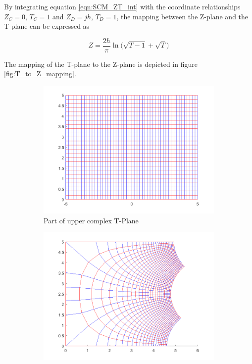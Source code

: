  \noindent By integrating equation \ref{eqn:SCM_ZT_int} with the coordinate relationships $Z_C = 0$, $T_C = 1$ and $Z_D = jh$, $T_D = 1$, the mapping between the Z-plane and the T-plane can be expressed as
  
   \begin{equation}
     Z = \frac{2h}{\pi}\ln\Big(\sqrt{T-1} + \sqrt{T}\Big)
     \label{eqn:TZ}
 \end{equation}
 
 \noindent The mapping of the T-plane to the Z-plane is depicted in figure \ref{fig:T_to_Z_mapping}. 
 
    \begin{figure}[h]
    \centering
    \begin{subfigure}[t]{0.45\textwidth}
        \centering
        \includegraphics[width=\textwidth]{images/TtoZ_strip.png}
        \caption{Part of upper complex T-Plane}
    \end{subfigure}
    \hfill
    \begin{subfigure}[t]{0.45\textwidth}
        \centering
        \includegraphics[width=\textwidth]{images/TtoZ_map.png}

\end{subfigure}
\end{figure}
